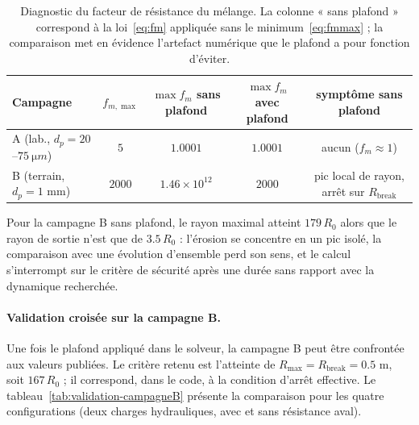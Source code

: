 \documentclass[11pt,a4paper]{report}
\begin{document}
\begin{table}[H]
\centering
\caption{Diagnostic du facteur de résistance du mélange. La colonne « sans plafond » correspond à la
loi~\eqref{eq:fm} appliquée sans le minimum~\eqref{eq:fmmax} ; la comparaison met en évidence l'artefact
numérique que le plafond a pour fonction d'éviter.}
\label{tab:fm-diagnostic}
\small
\begin{tabular}{lcccc}
\toprule
Campagne & \(f_{m,\max}\) & \(\max f_m\) sans plafond & \(\max f_m\) avec plafond & symptôme sans plafond \\
\midrule
A (lab., \(d_p = 20\)--\(75\ \si{\micro m}\)) & \(5\) & \(1.0001\) & \(1.0001\)
& aucun (\(f_m \approx 1\)) \\
B (terrain, \(d_p = 1\) mm) & \(2000\) & \(1.46\times10^{12}\) & \(2000\)
& pic local de rayon, arrêt sur \(R_{\mathrm{break}}\) \\
\bottomrule
\end{tabular}
\begin{tablenotes}
\small
\item Pour la campagne B sans plafond, le rayon maximal atteint \(179\,R_0\) alors que le rayon de sortie
n'est que de \(3.5\,R_0\) : l'érosion se concentre en un pic isolé, la comparaison avec une évolution
d'ensemble perd son sens, et le calcul s'interrompt sur le critère de sécurité après une durée sans
rapport avec la dynamique recherchée.
\end{tablenotes}
\end{table}

\paragraph{Validation croisée sur la campagne B.} Une fois le plafond appliqué dans le solveur, la
campagne B peut être confrontée aux valeurs publiées. Le critère retenu est l'atteinte de
\(R_{\max} = R_{\mathrm{break}} = 0.5\) m, soit \(167\,R_0\) ; il correspond, dans le code, à la
condition d'arrêt effective. Le tableau~\ref{tab:validation-campagneB} présente la comparaison pour les
quatre configurations (deux charges hydrauliques, avec et sans résistance aval).
\end{document}
